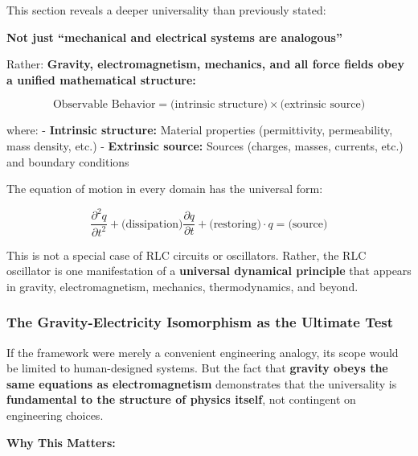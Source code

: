 \documentclass[
]{article}
\begin{document}
This section reveals a deeper universality than previously stated:

\textbf{Not just ``mechanical and electrical systems are analogous''}

Rather: \textbf{Gravity, electromagnetism, mechanics, and all force
fields obey a unified mathematical structure:}

\[\text{Observable Behavior} = \text{(intrinsic structure)} \times \text{(extrinsic source)}\]

where: - \textbf{Intrinsic structure:} Material properties
(permittivity, permeability, mass density, etc.) - \textbf{Extrinsic
source:} Sources (charges, masses, currents, etc.) and boundary
conditions

The equation of motion in every domain has the universal form:

\[\frac{\partial^2 q}{\partial t^2} + \text{(dissipation)} \frac{\partial q}{\partial t} + \text{(restoring)} \cdot q = \text{(source)}\]

This is not a special case of RLC circuits or oscillators. Rather, the
RLC oscillator is one manifestation of a \textbf{universal dynamical
principle} that appears in gravity, electromagnetism, mechanics,
thermodynamics, and beyond.

\subsubsection{The Gravity-Electricity Isomorphism as the Ultimate
Test}\label{the-gravity-electricity-isomorphism-as-the-ultimate-test}

If the framework were merely a convenient engineering analogy, its scope
would be limited to human-designed systems. But the fact that
\textbf{gravity obeys the same equations as electromagnetism}
demonstrates that the universality is \textbf{fundamental to the
structure of physics itself}, not contingent on engineering choices.

\textbf{Why This Matters:}
\end{document}

